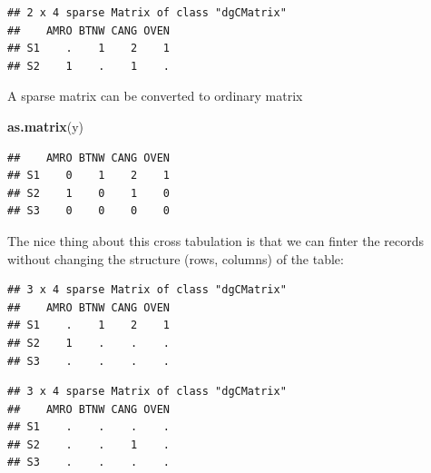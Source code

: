 \documentclass[12pt,]{book}
\newenvironment{Shaded}{\begin{snugshade}}{\end{snugshade}}
\newcommand{\KeywordTok}[1]{\textcolor[rgb]{0.13,0.29,0.53}{\textbf{#1}}}
\newcommand{\NormalTok}[1]{#1}
\newcommand{\OperatorTok}[1]{\textcolor[rgb]{0.81,0.36,0.00}{\textbf{#1}}}
\newcommand{\StringTok}[1]{\textcolor[rgb]{0.31,0.60,0.02}{#1}}
\begin{document}
\begin{verbatim}
## 2 x 4 sparse Matrix of class "dgCMatrix"
##    AMRO BTNW CANG OVEN
## S1    .    1    2    1
## S2    1    .    1    .
\end{verbatim}

A sparse matrix can be converted to ordinary matrix

\begin{Shaded}
\begin{Highlighting}[]
\KeywordTok{as.matrix}\NormalTok{(y)}
\end{Highlighting}
\end{Shaded}

\begin{verbatim}
##    AMRO BTNW CANG OVEN
## S1    0    1    2    1
## S2    1    0    1    0
## S3    0    0    0    0
\end{verbatim}

The nice thing about this cross tabulation is that we can finter the records without
changing the structure (rows, columns) of the table:

\begin{Shaded}
\end{Shaded}

\begin{verbatim}
## 3 x 4 sparse Matrix of class "dgCMatrix"
##    AMRO BTNW CANG OVEN
## S1    .    1    2    1
## S2    1    .    .    .
## S3    .    .    .    .
\end{verbatim}

\begin{Shaded}
\end{Shaded}

\begin{verbatim}
## 3 x 4 sparse Matrix of class "dgCMatrix"
##    AMRO BTNW CANG OVEN
## S1    .    .    .    .
## S2    .    .    1    .
## S3    .    .    .    .
\end{verbatim}
\end{document}
